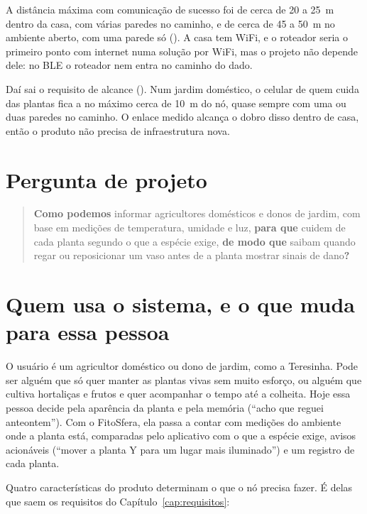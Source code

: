 A distância máxima com comunicação de sucesso foi de cerca de 20 a
\SI{25}{\metre} dentro da casa, com várias paredes no caminho, e de cerca
de 45 a \SI{50}{\metre} no ambiente aberto, com uma parede só ().
A casa tem WiFi, e o roteador seria o primeiro ponto com internet numa
solução por WiFi, mas o projeto não depende dele: no BLE o roteador nem
entra no caminho do dado.

Daí sai o requisito de alcance (). Num jardim doméstico, o
celular de quem cuida das plantas fica a no máximo cerca de
\SI{10}{\metre} do nó, quase sempre com uma ou duas paredes no caminho.
O enlace medido alcança o dobro disso dentro de casa, então o produto não
precisa de infraestrutura nova.

\section{Pergunta de projeto}

\begin{quote}
\textbf{Como podemos} informar agricultores domésticos e donos de
jardim, com base em medições de temperatura, umidade e luz,
\textbf{para que} cuidem de cada planta segundo o que a espécie exige,
\textbf{de modo que} saibam quando regar ou reposicionar um vaso antes
de a planta mostrar sinais de dano\textbf{?}
\end{quote}

\section{Quem usa o sistema, e o que muda para essa pessoa}

O usuário é um agricultor doméstico ou dono de jardim, como a Teresinha.
Pode ser alguém que só quer manter as plantas vivas sem muito esforço, ou
alguém que cultiva hortaliças e frutos e quer acompanhar o tempo até a
colheita. Hoje essa pessoa decide pela aparência da planta e pela memória
(\enquote{acho que reguei anteontem}). Com o FitoSfera, ela passa a
contar com medições do ambiente onde a planta está, comparadas pelo
aplicativo com o que a espécie exige, avisos acionáveis
(\enquote{mover a planta Y para um lugar mais iluminado}) e um registro
de cada planta.

Quatro características do produto determinam o que o nó precisa fazer.
É delas que saem os requisitos do Capítulo~\ref{cap:requisitos}:

